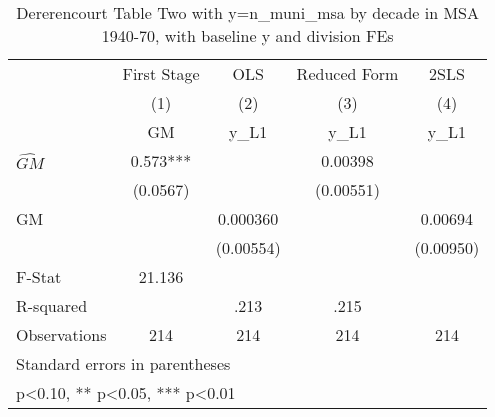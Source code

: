 \begin{table}[htbp]\centering
\def\sym#1{\ifmmode^{#1}\else\(^{#1}\)\fi}
\caption{Dererencourt Table Two with y=n\_muni\_msa by decade in MSA 1940-70, with baseline y and division FEs}
\begin{tabular}{l*{4}{c}}
\toprule
                    & First Stage   &         OLS   &Reduced Form   &        2SLS   \\
                    &\multicolumn{1}{c}{(1)}&\multicolumn{1}{c}{(2)}&\multicolumn{1}{c}{(3)}&\multicolumn{1}{c}{(4)}\\
                    &\multicolumn{1}{c}{GM}&\multicolumn{1}{c}{y\_L1}&\multicolumn{1}{c}{y\_L1}&\multicolumn{1}{c}{y\_L1}\\
\midrule
$\hat{GM}$          &       0.573***&               &     0.00398   &               \\
                    &    (0.0567)   &               &   (0.00551)   &               \\
\addlinespace
GM                  &               &    0.000360   &               &     0.00694   \\
                    &               &   (0.00554)   &               &   (0.00950)   \\
\midrule
F-Stat              &      21.136   &               &               &               \\
R-squared           &               &        .213   &        .215   &               \\
Observations        &         214   &         214   &         214   &         214   \\
\bottomrule
\multicolumn{5}{l}{\footnotesize Standard errors in parentheses}\\
\multicolumn{5}{l}{\footnotesize * p<0.10, ** p<0.05, *** p<0.01}\\
\end{tabular}
\end{table}
